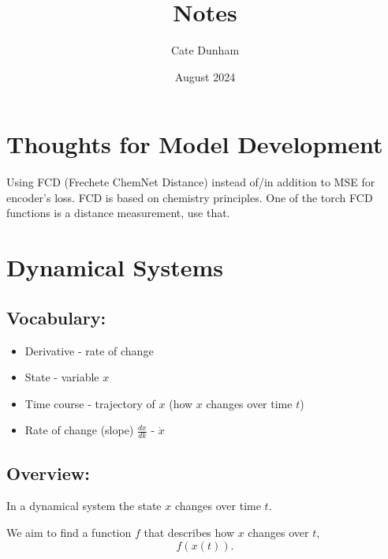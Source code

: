 \documentclass{article}
\title{Notes}
\author{Cate Dunham}
\date{August 2024}
\begin{document}
\maketitle


\section{Thoughts for Model Development}

Using FCD (Frechete ChemNet Distance) instead of/in addition to MSE for encoder's loss. FCD is based on chemistry principles. 
One of the torch FCD functions is a distance measurement, use that.

\section{Dynamical Systems}


\subsection{Vocabulary:}
\begin{itemize}
    \item Derivative - rate of change
    \item State - variable $x$
    \item Time course - trajectory of $x$ (how $x$ changes over time $t$)
    \item Rate of change (slope) $\frac{dx}{dk}$ - $\dot{x}$
\end{itemize}

\subsection{Overview:}
In a dynamical system the state $x$ changes over time $t$.

We aim to find a function $f$ that describes how $x$ changes over $t$, 
\begin{equation}
    f(x(t)).
\end{equation}
\end{document}
